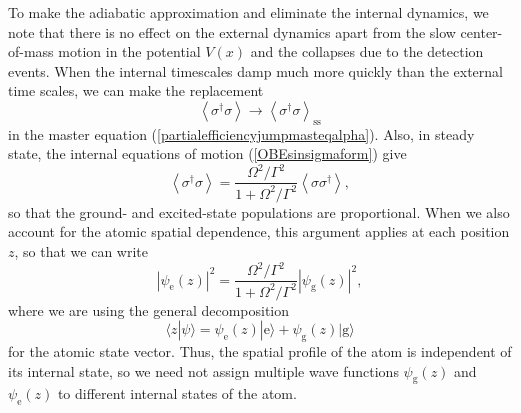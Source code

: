 \documentclass[aps,twocolumn,superscriptaddress,footinbib,floatfix,showpacs]{revtex4}
\def\ket#1{|{#1}\rangle}
\def\expct#1{\!\left\langle{#1}\right\rangle}
\def\ss{_{\mathrm{ss}}}
\begin{document}
To make the adiabatic approximation and eliminate the internal dynamics,
we note that there is no effect on the external dynamics apart
from the slow center-of-mass motion in the potential $V(x)$ and
the collapses due to the detection events.
When the internal timescales damp much more quickly than the external
time scales, we can make the replacement
\begin{equation}
  \expct{\sigma^\dagger\sigma}\longrightarrow
  \expct{\sigma^\dagger\sigma}\ss
\end{equation}
in the master equation (\ref{partialefficiencyjumpmasteqalpha}).
Also, in steady state, the internal equations of motion
(\ref{OBEsinsigmaform})
give
\begin{equation}
  \expct{\sigma^\dagger\sigma} 
   = \frac{\Omega^2/\Gamma^2}{1+\Omega^2/\Gamma^2}
  \expct{\sigma\sigma^\dagger},
\end{equation}
so that the ground- and excited-state populations are proportional.
When we also account for the atomic spatial dependence,
this argument applies at each position $z$, so that we can
write
\begin{equation}
  |\psi_\mathrm{e}(z)|^2
   = \frac{\Omega^2/\Gamma^2}{1+\Omega^2/\Gamma^2}
  |\psi_\mathrm{g}(z)|^2,
\end{equation}
where we are using the general decomposition 
\begin{equation}
  \langle z|\psi\rangle = \psi_\mathrm{e}(z)\ket{\mathrm{e}} + 
    \psi_\mathrm{g}(z)\ket{\mathrm{g}}
  \label{egequiv}
\end{equation}
for the atomic state vector.
Thus, the spatial profile of the atom is independent of its internal state,
so we need not assign multiple wave functions
$\psi_\mathrm{g}(z)$ and $\psi_\mathrm{e}(z)$ 
to different internal states of the atom.
\end{document}
